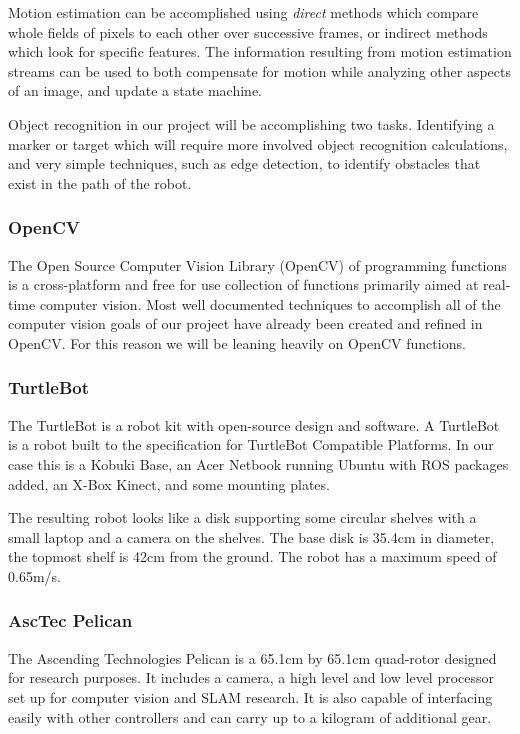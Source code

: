 \documentclass{article}
\begin{document}
		Motion estimation can be accomplished using \textit{direct} methods which compare whole fields of pixels to each other over successive frames, or indirect methods which look for specific features. The information resulting from motion estimation streams can be used to both compensate for motion while analyzing other aspects of an image, and update a state machine.
		
		Object recognition in our project will be accomplishing two tasks. Identifying a marker or target which will require more involved object recognition calculations, and very simple techniques, such as edge detection, to identify obstacles that exist in the path of the robot.
		
		\subsubsection{OpenCV}
		
		The Open Source Computer Vision Library (OpenCV) of programming functions is a cross-platform and free for use collection of functions primarily aimed at real-time computer vision\cite{opencv}. Most well documented techniques to accomplish all of the computer vision goals of our project have already been created and refined in OpenCV. For this reason we will be leaning heavily on OpenCV functions.
		
		\subsubsection{TurtleBot}
		
		The TurtleBot is a robot kit with open-source design and software. A TurtleBot is a robot built to the specification for TurtleBot Compatible Platforms\cite{wise_foote_2011}. In our case this is a Kobuki Base, an Acer Netbook running Ubuntu with ROS packages added, an X-Box Kinect, and some mounting plates. 
		
		The resulting robot looks like a disk supporting some circular shelves with a small laptop and a camera on the shelves. The base disk is 35.4cm in diameter, the topmost shelf is 42cm from the ground. The robot has a maximum speed of 0.65m/s. 
		
		\subsubsection{AscTec Pelican}
		
		The Ascending Technologies Pelican is a 65.1cm by 65.1cm quad-rotor  designed for research purposes\cite{asctec}. It includes a camera, a high level and low level processor set up for computer vision and SLAM research. It is also capable of interfacing easily with other controllers and can carry up to a kilogram of additional gear.
		
\end{document}
